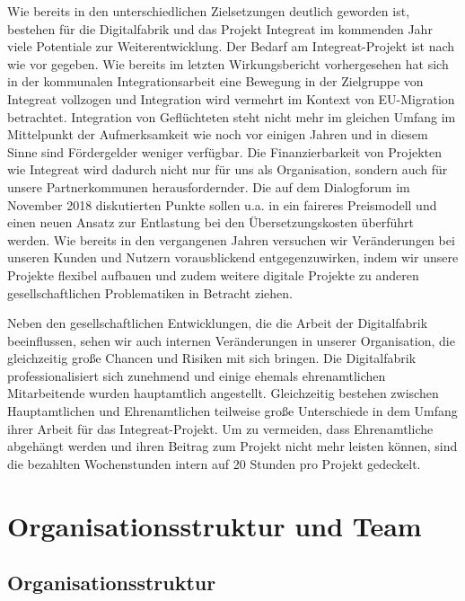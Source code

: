 \documentclass[12pt, a4paper]{article} %
\begin{document}
Wie bereits in den unterschiedlichen Zielsetzungen deutlich geworden
ist, bestehen für die Digitalfabrik und das Projekt Integreat im
kommenden Jahr viele Potentiale zur Weiterentwicklung. Der Bedarf am
Integreat-Projekt ist nach wie vor gegeben. Wie bereits im letzten
Wirkungsbericht vorhergesehen hat sich in der kommunalen
Integrationsarbeit eine Bewegung in der Zielgruppe von Integreat
vollzogen und Integration wird vermehrt im Kontext von EU-Migration
betrachtet. Integration von Geflüchteten steht nicht mehr im gleichen
Umfang im Mittelpunkt der Aufmerksamkeit wie noch vor einigen Jahren und
in diesem Sinne sind Fördergelder weniger verfügbar. Die
Finanzierbarkeit von Projekten wie Integreat wird dadurch nicht nur für
uns als Organisation, sondern auch für unsere Partnerkommunen
herausfordernder. Die auf dem Dialogforum im November 2018 diskutierten
Punkte sollen u.a. in ein faireres Preismodell und einen neuen Ansatz
zur Entlastung bei den Übersetzungskosten überführt werden. Wie bereits
in den vergangenen Jahren versuchen wir Veränderungen bei unseren Kunden
und Nutzern vorausblickend entgegenzuwirken, indem wir unsere Projekte
flexibel aufbauen und zudem weitere digitale Projekte zu anderen
gesellschaftlichen Problematiken in Betracht ziehen.

Neben den gesellschaftlichen Entwicklungen, die die Arbeit der
Digitalfabrik beeinflussen, sehen wir auch internen Veränderungen in
unserer Organisation, die gleichzeitig große Chancen und Risiken mit
sich bringen. Die Digitalfabrik professionalisiert sich zunehmend und
einige ehemals ehrenamtlichen Mitarbeitende wurden hauptamtlich
angestellt. Gleichzeitig bestehen zwischen Hauptamtlichen und
Ehrenamtlichen teilweise große Unterschiede in dem Umfang ihrer Arbeit
für das Integreat-Projekt. Um zu vermeiden, dass Ehrenamtliche abgehängt
werden und ihren Beitrag zum Projekt nicht mehr leisten können, sind die
bezahlten Wochenstunden intern auf 20 Stunden pro Projekt gedeckelt.

\hypertarget{organisationsstruktur-und-team}{%
\section{Organisationsstruktur und
Team}\label{organisationsstruktur-und-team}}

\hypertarget{organisationsstruktur}{%
\subsection{Organisationsstruktur}\label{organisationsstruktur}}
\end{document}
